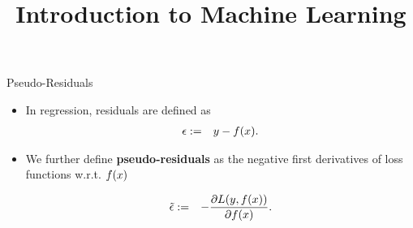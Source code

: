 




\newcommand{\titlefigure}{figure_man/optimization_steps.jpeg}
\newcommand{\learninggoals}{
\item Learn what pseudo-residuals are 
\item Understand the relationship between pseudo-residuals and gradient descent 
}

\title{Introduction to Machine Learning}
\date{}






\begin{vbframe}{Pseudo-Residuals}

\begin{itemize}
	\item In regression, residuals are defined as 
	\begin{eqnarray*}
		\epsilon &:=& y - f(x).
	\end{eqnarray*}
\item We further define \textbf{pseudo-residuals} as the negative first derivatives of loss functions w.r.t. $f(x)$

  \begin{eqnarray*}
    \tilde \eps &:=& - \frac{\partial \Lxy}{\partial \fx}.  %
  \end{eqnarray*}
\end{itemize}

\end{vbframe}


